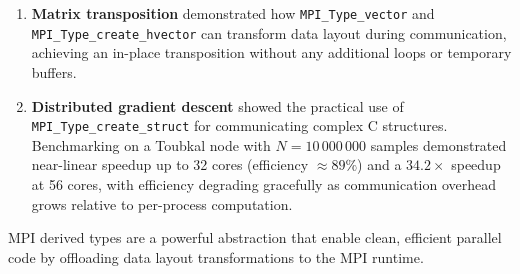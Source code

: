 \documentclass[11pt,a4paper]{article}
\begin{document}
\begin{enumerate}
    \item \textbf{Matrix transposition} demonstrated how \texttt{MPI\_Type\_vector} and \texttt{MPI\_Type\_create\_hvector} can transform data layout during communication, achieving an in-place transposition without any additional loops or temporary buffers.
    
    \item \textbf{Distributed gradient descent} showed the practical use of \texttt{MPI\_Type\_create\_struct} for communicating complex C structures. Benchmarking on a Toubkal node with $N = 10\,000\,000$ samples demonstrated near-linear speedup up to 32 cores (efficiency $\approx 89\%$) and a $34.2\times$ speedup at 56 cores, with efficiency degrading gracefully as communication overhead grows relative to per-process computation.
\end{enumerate}

MPI derived types are a powerful abstraction that enable clean, efficient parallel code by offloading data layout transformations to the MPI runtime.
\end{document}
